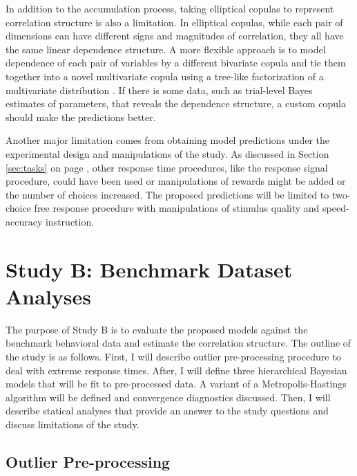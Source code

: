 \documentclass[12pt]{report}
\begin{document}
In addition to the accumulation process, taking elliptical copulas to represent correlation structure is also a limitation. In elliptical copulas, while each pair of dimensions can have different signs and magnitudes of correlation, they all have the same linear dependence structure. A more flexible approach is to model dependence of each pair of variables by a different bivariate copula and tie them together into a novel multivariate copula using a tree-like factorization of a multivariate distribution \citep{Cza2010}. If there is some data, such as trial-level Bayes estimates of parameters, that reveals the dependence structure, a custom copula should make the predictions better.

Another major limitation comes from obtaining model predictions under the experimental design and manipulations of the \citet{RatRou1998} study. As discussed in Section \ref{sec:tasks} on page \pageref{sec:tasks}, other response time procedures, like the response signal procedure, could have been used or manipulations of rewards might be added or the number of choices increased. The proposed predictions will be limited to two-choice free response procedure with manipulations of stimulus quality and speed-accuracy instruction.

\section{Study B: Benchmark Dataset Analyses}

The purpose of Study B is to evaluate the proposed models
against the benchmark behavioral data and estimate the correlation structure. The outline of the study is as follows. First, I will describe outlier pre-processing procedure to deal with extreme response times. After, I will define three hierarchical Bayesian models that will be fit to pre-processed data. A variant of a Metropolis-Hastings algorithm will be defined and convergence diagnostics discussed. Then, I will describe statical analyses that provide an answer to the study questions and discuss limitations of the study.

\subsection{Outlier Pre-processing}
\end{document}

